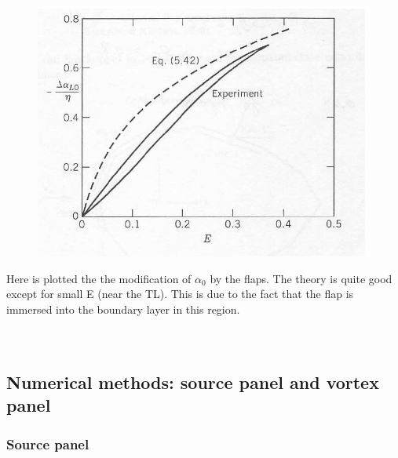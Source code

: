 	\begin{figure}
	\vspace{-5mm}
	\includegraphics[scale=0.1]{ch2/38}
	\end{figure}
	Here is plotted the the modification of $\alpha _0$ by the flaps. The theory is quite good except for small E (near the TL). This is due to the fact that the flap is immersed into the boundary layer in this region. 
	\ \\\\\\


\subsection{Numerical methods: source panel and vortex panel}
\subsubsection{Source panel}

